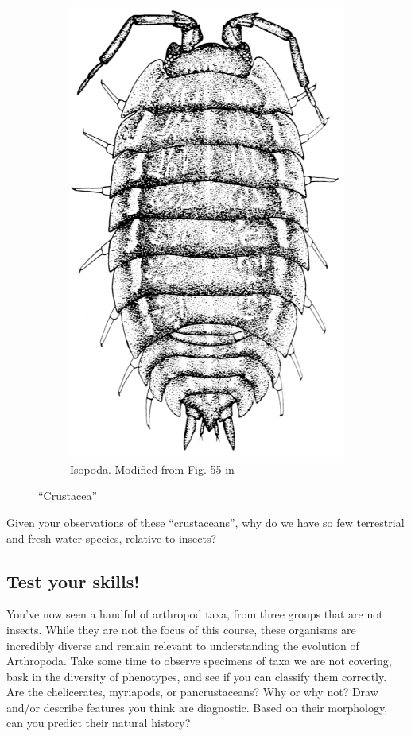 \documentclass[letterpaper, 11pt]{article}
\begin{document}
\begin{figure}[ht!]
\begin{subfigure}[ht!]{0.25\textwidth}
        \includegraphics[width=\textwidth]{isopod55}
        \caption{Isopoda. Modified from Fig. 55 in \cite{bhlitem148531crust}}
        \label{fig:isopod2}
    \end{subfigure}
    \caption{``Crustacea''} 
\end{figure}


\noindent{}Given your observations of these ``crustaceans'', why do we have so few terrestrial and fresh water species, relative to insects? \vspace{2cm}

\subsection{Test your skills!}
You've now seen a handful of arthropod taxa, from three groups that are not insects. While they are not the focus of this course, these organisms are incredibly diverse and remain relevant to understanding the evolution of Arthropoda. Take some time to observe specimens of taxa we are not covering, bask in the diversity of phenotypes, and see if you can classify them correctly. Are the chelicerates, myriapods, or pancrustaceans? Why or why not? Draw and/or describe features you think are diagnostic. Based on their morphology, can you predict their natural history?
\end{document}
